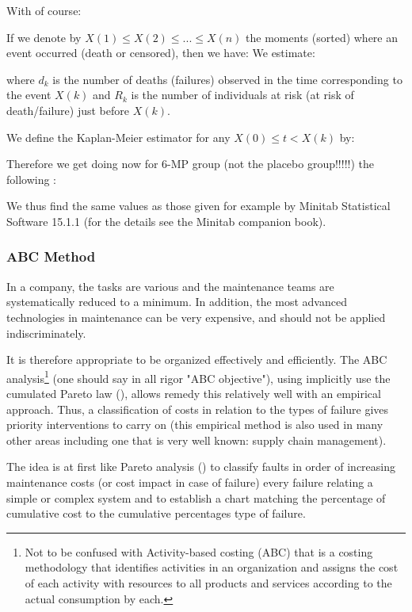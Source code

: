 	With of course:
	
	If we denote by $X(1)\leq X(2)\leq ...\leq X(n)$ the moments (sorted) where an event occurred (death or censored), then we have:
	We estimate:
	
	where $d_k$ is the number of deaths (failures) observed in the time corresponding to the event $X(k)$ and $R_k$ is the number of individuals at risk (at risk of death/failure) just before $X(k)$.
	
	We define the Kaplan-Meier estimator for any $X(0)\leq t <X(k)$ by:
	
	Therefore we get doing now for 6-MP group (not the placebo group!!!!!) the following :
	
	We thus find the same values as those given for example by Minitab Statistical Software 15.1.1 (for the details see the Minitab companion book).
	
	\pagebreak
	\subsubsection{ABC Method}
	In a company, the tasks are various and the maintenance teams are systematically reduced to a minimum. In addition, the most advanced technologies in maintenance can be very expensive, and should not be applied indiscriminately.
	
	It is therefore appropriate to be organized effectively and efficiently. The ABC analysis\footnote{Not to be confused with Activity-based costing (ABC) that is a costing methodology that identifies activities in an organization and assigns the cost of each activity with resources to all products and services according to the actual consumption by each.} (one should say in all rigor "ABC objective"), using implicitly use the cumulated Pareto law (), allows remedy this relatively well with an empirical approach. Thus, a classification of costs in relation to the types of failure gives priority interventions to carry on (this empirical method is also used in many other areas including one that is very well known: supply chain management).
	
	The idea is at first like Pareto analysis () to classify faults in order of increasing maintenance costs (or cost impact in case of failure) every failure relating a simple or complex system and to establish a chart matching the percentage of cumulative cost  to the cumulative percentages type of failure.
	
